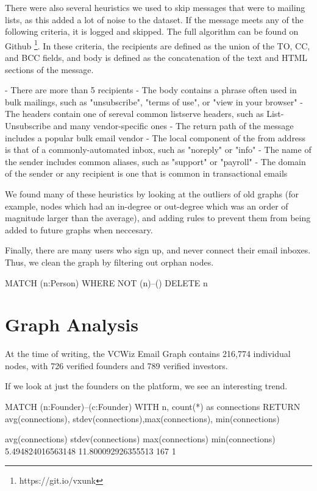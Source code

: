 There were also several heuristics we used to skip messages that were to mailing lists, as this added a lot of noise to the dataset. If the message meets any of the following criteria, it is logged and skipped. The full algorithm can be found on Github \footnote{https://git.io/vxunk}. In these criteria, the recipients are defined as the union of the TO, CC, and BCC fields, and body is defined as the concatenation of the text and HTML sections of the message.

- There are more than 5 recipients
- The body contains a phrase often used in bulk mailings, such as "unsubscribe", "terms of use", or "view in your browser"
- The headers contain one of sereval common listserve headers, such as List-Unsubscribe and many vendor-specific ones
- The return path of the message includes a popular bulk email vendor
- The local component of the from address is that of a commonly-automated inbox, such as "noreply" or "info"
- The name of the sender includes common aliases, such as "support" or "payroll"
- The domain of the sender or any recipient is one that is common in transactional emails

We found many of these heuristics by looking at the outliers of old graphs (for example, nodes which had an in-degree or out-degree which was an order of magnitude larger than the average), and adding rules to prevent them from being added to future graphs when neccesary.

Finally, there are many users who sign up, and never connect their email inboxes. Thus, we clean the graph by filtering out orphan nodes.

MATCH (n:Person)
WHERE NOT (n)--()
DELETE n

\section{Graph Analysis}

At the time of writing, the VCWiz Email Graph contains 216,774 individual nodes, with 726 verified founders and 789 verified investors.

If we look at just the founders on the platform, we see an interesting trend.

MATCH (n:Founder)--(c:Founder)
WITH n, count(*) as connections
RETURN avg(connections), stdev(connections),max(connections), min(connections)

avg(connections)  stdev(connections)  max(connections)  min(connections)
5.494824016563148 11.800092926355513  167 1

